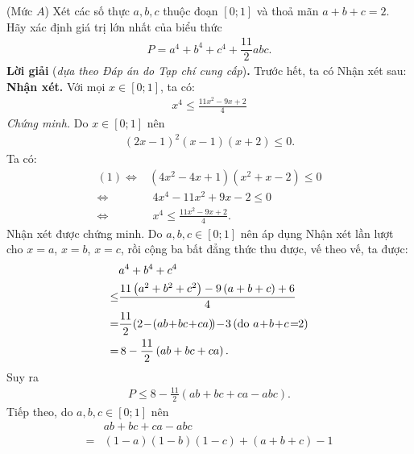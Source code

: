 \begin{multicols}{2}
	(Mức $A$) Xét các số thực $a,b,c$ thuộc đoạn $[0;1]$ và thoả mãn $a+b+c=2$. Hãy xác định giá trị lớn nhất của biểu thức
	\begin{align*}
		P=a^4+b^4+c^4+\dfrac{11}2abc.
	\end{align*}
	\textbf{\color{thachthuctoanhoc}Lời giải} (\textit{dựa theo Đáp án do Tạp chí cung cấp})\textbf{\color{thachthuctoanhoc}.}
	\vskip 0.05cm
	Trước hết, ta có Nhận xét sau:
	\vskip 0.05cm
	\textbf{\color{thachthuctoanhoc}Nhận xét.} Với mọi $x \in [0;1]$,  ta có:
	\begin{align*}
		{x^4} \le \frac{{11{x^2} - 9x + 2}}{4}
	\end{align*}
	\textit{Chứng minh.} Do $x \in [0;1]$  nên
	\begin{align*}
		{\left( {2x - 1} \right)^2}\left( {x - 1} \right)\left( {x + 2} \right) \le 0. \tag{$1$}
	\end{align*}
	Ta có:
	\begin{align*}
		(1) \Leftrightarrow &\left( {4{x^2} - 4x + 1} \right)\left( {{x^2} + x - 2} \right) \le 0\\
		\Leftrightarrow &\,\, 4{x^4} - 11{x^2} + 9x - 2 \le 0\\
		\Leftrightarrow & \,\,{x^4} \le \frac{{11{x^2} - 9x + 2}}{4}.
	\end{align*}
	Nhận xét được chứng minh.
	\vskip 0.05cm
	Do $a,b,c \in [0;1]$ nên áp dụng Nhận xét lần lượt cho $x = a$, $x = b$, $x = c$, rồi cộng ba bất đẳng thức thu được, vế theo vế, ta được:
	\begin{align*}
			&{a^4} + {b^4} + {c^4} \\
			\le &\frac{{11\left( {{a^2} + {b^2} + {c^2}} \right) - 9\left( {a + b + c} \right) + 6}}{4}\\
			 = &\frac{{11}}{2}\!\left( {2 \!-\! \left( {ab \!+\! bc \!+\! ca} \right)\!} \right) \!-\! 3\left({{\text{\color{black}do }}a \!+\! b \!+\! c \!=\!\! 2} \right)\\
			 = &\,8 - \frac{{11}}{2}\left( {ab + bc + ca} \right).
	\end{align*}
	Suy ra
	\begin{align*}
		P \le 8 - \frac{{11}}{2}\left( {ab + bc + ca - abc} \right).\tag{$2$}
	\end{align*}
	Tiếp theo, do  $a,b,c \in [0;1]$ nên
	\begin{align*}
			&ab + bc + ca - abc\\
			 = &\left( {1 \!- \!a} \right)\left( {1 \!-\! b} \right)\left( {1 \!-\! c} \right) \!+\! \left( {a \!+\! b \!+\! c} \right) \!-\! 1\\

\end{align*}
\end{multicols}
